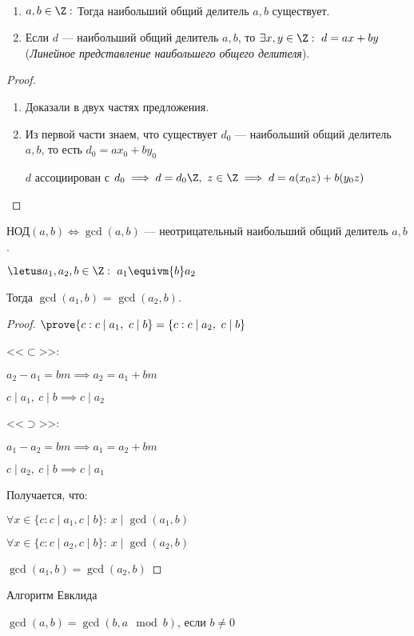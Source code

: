 \begin{follow}~
    \begin{enumerate}
        \item $a, b \in \Z:$ Тогда наибольший общий делитель $a, b$ существует.
        
        \item Если $d$ --- наибольший общий делитель $a, b$, то $\exists x, y \in \Z:~d = ax + by$ \quad (\emph{Линейное представление наибольшего общего делителя}).
    \end{enumerate}
\end{follow}

\begin{proof}
    \begin{enumerate}
        \item Доказали в двух частях предложения.
        
        \item Из первой части знаем, что существует $d_0$ --- наибольший общий делитель $a, b$, то есть $d_0 = ax_0 + by_0$
        
        $d$ ассоциирован с $d_0 \implies d = d_0\Z,~ z \in \Z \implies d = a(x_0z) + b(y_0z)$
    \end{enumerate}
\end{proof}

\begin{defn}
    НОД$(a, b) \iff \gcd(a, b)$ --- неотрицательный наибольший общий делитель $a, b$.
\end{defn}

\begin{theorem-non}
    $\letus a_1, a_2, b \in \Z:\ a_1 \equivm{b} a_2$
    
    Тогда $\gcd(a_1, b)$ = $\gcd(a_2, b)$.
\end{theorem-non}

\begin{proof}
    $\prove \{c: c \mid a_1,~ c \mid b \} = \{c : c \mid a_2,~ c \mid b\}$
    
    <<$\subset$>>:
    
    $a_2 - a_1 = bm \implies a_2 = a_1 + bm$
    
    $c \mid a_1,~c \mid b \implies c \mid a_2$

    <<$\supset$>>:
    
    $a_1 - a_2 = bm \implies a_1 = a_2 + bm$

    $c \mid a_2,~ c \mid b \implies c \mid a_1$

    Получается, что:
    
    $\forall x \in \{c: c \mid a_1, c \mid b \}:\ x \mid \gcd(a_1, b)$
    
    $\forall x \in \{c: c \mid a_2, c \mid b \}:\ x \mid \gcd(a_2, b)$
    
    $\gcd(a_1, b) = \gcd(a_2, b)$
\end{proof}

\begin{defn} 
    Алгоритм Евклида

    $\gcd(a, b) = \gcd(b, a \mod b)$, если $b \neq 0$
\end{defn}

